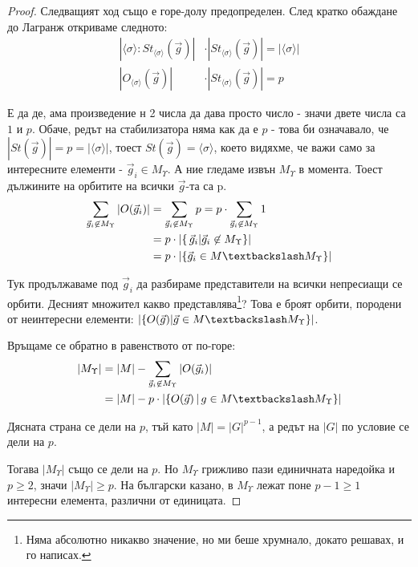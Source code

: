 \documentclass{article}
\newcommand{\grsigma}[0]{{\langle \sigma \rangle}}
\begin{document}
\begin{proof}
    Следващият ход също е горе-долу предопределен. След кратко обаждане до Лагранж откриваме следното:
    \begin{align*}
        |\grsigma:St_{\grsigma}(\vec g)| &\cdot |St_{\grsigma}(\vec g)| = |\grsigma|\\
        |O_\grsigma(\vec g)| &\cdot |St_{\grsigma}(\vec g)| = p
    \end{align*}

    Е да де, ама произведение н 2 числа да дава просто число - значи двете числа са $1$ и $p$.
    Обаче, редът на стабилизатора няма как да е $p$ - това би означавало, че $|St(\vec g)| = p = |\grsigma|$, тоест $St(\vec g) = \grsigma$, което видяхме, че важи само за интересните елементи - ${\vec g_i \in M_\Upsilon}$.
    А ние гледаме извън $M_\Upsilon$ в момента.
    Тоест дължините на орбитите на всички $\vec g$-та са p.
    \begin{align*}
        \sum_\gunint |O(\vec g_i)| &= \sum_\gunint p = p \cdot \sum_\gunint 1\\
        &= p \cdot |\{\,\vec g_i | \gunint \}|\\
        &= p \cdot |\{\vec g_i \in M \textbackslash M_\Upsilon\}|
    \end{align*}

    Тук продължаваме под $\vec g_i$ да разбираме представители на всички непресиащи се орбити.
    Десният множител какво представлява\footnote{Няма абсолютно никакво значение, но ми беше хрумнало, докато решавах, и го написах.}?
    Това е броят орбити, породени от неинтересни елементи:
    ${|\{ O(\vec g) | \vec g \in M \textbackslash M_\Upsilon \}|}$.

    Връщаме се обратно в равенството от по-горе:
    \begin{align*}
        |M_\Upsilon| &= |M| - \sum_{\gunint} |O(\vec g_i)|\\
        &= |M| - p \cdot | \{ O(\vec g) \,|\, g \in M \textbackslash M_\Upsilon \}|
    \end{align*}

    Дясната страна се дели на $p$, тъй като $|M| = |G|^{p-1}$, а редът на $|G|$ по условие се дели на $p$.

    Тогава $|M_\Upsilon|$ също се дели на $p$. Но $M_\Upsilon$ грижливо пази единичната наредойка и $p \ge 2$, значи $|M_\Upsilon| \ge p$.
    На български казано, в $M_\Upsilon$ лежат поне $p-1 \ge 1$ интересни елемента, различни от единицата.
\end{proof}
\end{document}
